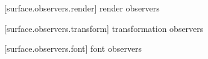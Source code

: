 %	

 [surface.observers.render] { render observers}

%	

 [surface.observers.transform] { transformation observers}

%	

 [surface.observers.font] { font observers}

%	
